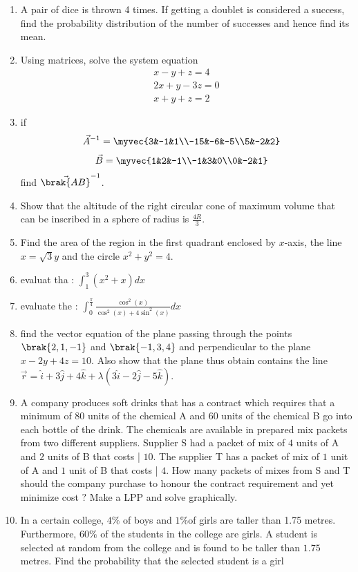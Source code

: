 \documentclass{article}
\begin{document}
\begin{enumerate}
\item A pair of dice is thrown 4 times. If getting a doublet is considered a success, find the probability distribution of the number of successes and hence find its mean.
\item Using matrices, solve the system equation \begin{align*}
		x-y+z = 4 \\ 2x+y-3z = 0\\ x+y+z = 2
\end{align*}
\item if
\begin{align*}
\vec{A}^{-1}&=\myvec{3&-1&1\\-15&-6&-5\\5&-2&2} 
\end{align*}
\begin{align*}
\vec{B}&=\myvec{1&2&-1\\-1&3&0\\0&-2&1} 
\end{align*}
find $\vec{\brak{AB}}^{-1}$.
\item Show that the altitude of the right circular cone of maximum volume that can be inscribed in a sphere of radius is $\frac{4R}{3}$.
\item Find the area of the region in the first quadrant enclosed by $x$-axis, the line $ x = \sqrt{3}y $ and the circle $x^{2} + y^{2} = 4$.
\item evaluat tha : $\int_{1}^{3}(x^{2} + x)dx$ 
\item evaluate the : $\int_{0}^{\frac{\pi}{4}} \frac{\cos^{2}(x)} {\cos^{2}(x) + 4\sin^{2}(x)} dx$
\item find the vector equation of the plane passing through the points $ \brak {2,1,-1}$ and $\brak {-1,3,4}$ and perpendicular to the plane $ x-2y + 4z = 10 $. Also show that the plane thus obtain contains the line $\overrightarrow{r} = \hat{i}+3\hat{j}+4\hat{k}+\lambda(3\hat{i}-2\hat{j}-5\hat{k}).$ 
\item A company produces soft drinks that has a contract which requires that a minimum of $80$ units of the chemical A and $60$ units of the chemical B go into each bottle of the drink. The chemicals are available in prepared mix packets from two different suppliers. Supplier S had a packet of mix of $4$ units of A and $2$ units of B that costs | $10.$ The supplier T has a packet of mix of $1$ unit of A and $1$ unit of B that costs | $4$. How many packets of mixes from S and T should the company purchase to honour the contract requirement and yet minimize cost $?$ Make a LPP and solve graphically.
\item In a certain college, $4\%$ of boys and $1\% $of girls are taller than 1.75  metres. Furthermore, $ 60\% $ of the students in the college are girls. A student is selected at random from the college and is found to be taller than $1.75 $ metres. Find the probability that the selected student is a girl
\end{enumerate}
\end{document}
